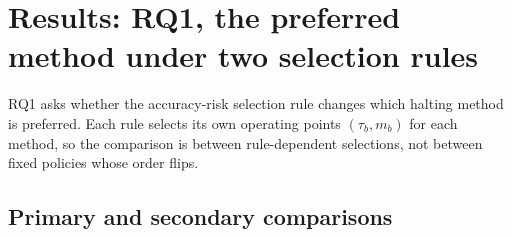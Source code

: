 \section{Results: RQ1, the preferred method under two selection rules}

RQ1 asks whether the accuracy-risk selection rule changes which halting method is preferred. Each rule selects its own operating points \((\tau_b, m_b)\) for each method, so the comparison is between rule-dependent selections, not between fixed policies whose order flips.

\subsection{Primary and secondary comparisons}

\begin{table}[t]
\centering\small
\caption{π1-x minus native-pb under the two selection rules. The first two rows are development-data results; the last three are on the sealed TEST set. The G3a value to four decimals is −0.0236.}
\end{table}

